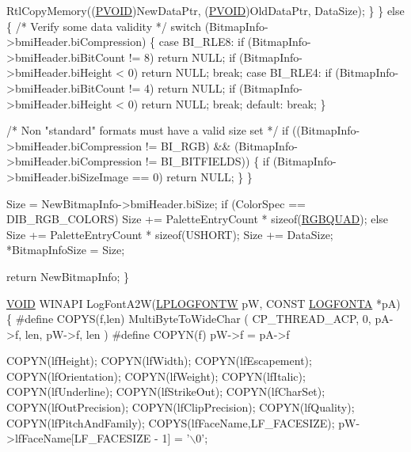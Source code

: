 \begin{DoxyCodeInclude}
            RtlCopyMemory((\hyperlink{interfacevoid}{PVOID})NewDataPtr, (\hyperlink{interfacevoid}{PVOID})OldDataPtr, DataSize);
        \}
    \}
    \textcolor{keywordflow}{else}
    \{
        \textcolor{comment}{/* Verify some data validity */}
        \textcolor{keywordflow}{switch} (BitmapInfo->bmiHeader.biCompression)
        \{
            \textcolor{keywordflow}{case} BI\_RLE8:
                \textcolor{keywordflow}{if} (BitmapInfo->bmiHeader.biBitCount != 8)
                    \textcolor{keywordflow}{return} NULL;
                \textcolor{keywordflow}{if} (BitmapInfo->bmiHeader.biHeight < 0)
                    \textcolor{keywordflow}{return} NULL;
                \textcolor{keywordflow}{break};
            \textcolor{keywordflow}{case} BI\_RLE4:
                \textcolor{keywordflow}{if} (BitmapInfo->bmiHeader.biBitCount != 4)
                    \textcolor{keywordflow}{return} NULL;
                \textcolor{keywordflow}{if} (BitmapInfo->bmiHeader.biHeight < 0)
                    \textcolor{keywordflow}{return} NULL;
                \textcolor{keywordflow}{break};
            \textcolor{keywordflow}{default}:
                \textcolor{keywordflow}{break};
        \}

        \textcolor{comment}{/* Non "standard" formats must have a valid size set */}
        \textcolor{keywordflow}{if} ((BitmapInfo->bmiHeader.biCompression != BI\_RGB) &&
                (BitmapInfo->bmiHeader.biCompression != BI\_BITFIELDS))
        \{
            \textcolor{keywordflow}{if} (BitmapInfo->bmiHeader.biSizeImage == 0)
                \textcolor{keywordflow}{return} NULL;
        \}
    \}

    Size = NewBitmapInfo->bmiHeader.biSize;
    \textcolor{keywordflow}{if} (ColorSpec == DIB\_RGB\_COLORS)
        Size += PaletteEntryCount * \textcolor{keyword}{sizeof}(\hyperlink{structtag_r_g_b_q_u_a_d}{RGBQUAD});
    \textcolor{keywordflow}{else}
        Size += PaletteEntryCount * \textcolor{keyword}{sizeof}(USHORT);
    Size += DataSize;
    *BitmapInfoSize = Size;

    \textcolor{keywordflow}{return} NewBitmapInfo;
\}

\hyperlink{interfacevoid}{VOID}
WINAPI
LogFontA2W(\hyperlink{structtag_l_o_g_f_o_n_t_w}{LPLOGFONTW} pW, CONST \hyperlink{struct_l_o_g_f_o_n_t_a}{LOGFONTA} *pA)
\{
\textcolor{preprocessor}{#define COPYS(f,len) MultiByteToWideChar ( CP\_THREAD\_ACP, 0, pA->f, len, pW->f, len )}
\textcolor{preprocessor}{#define COPYN(f) pW->f = pA->f}

    COPYN(lfHeight);
    COPYN(lfWidth);
    COPYN(lfEscapement);
    COPYN(lfOrientation);
    COPYN(lfWeight);
    COPYN(lfItalic);
    COPYN(lfUnderline);
    COPYN(lfStrikeOut);
    COPYN(lfCharSet);
    COPYN(lfOutPrecision);
    COPYN(lfClipPrecision);
    COPYN(lfQuality);
    COPYN(lfPitchAndFamily);
    COPYS(lfFaceName,LF\_FACESIZE);
    pW->lfFaceName[LF\_FACESIZE - 1] = \textcolor{charliteral}{'\(\backslash\)0'};


\end{DoxyCodeInclude}
